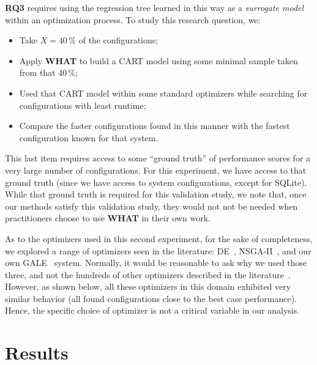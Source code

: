 \documentclass{sig-alternative}
\newcommand{\bi}{\begin{itemize}}%
\newcommand{\ei}{\end{itemize}}
\newcommand{\what}{{\bf WHAT }}
\begin{document}
{\bf RQ3} requires using the regression tree learned in this way as a {\em surrogate model} within an optimization process. To study this research question, we:
\bi
\item Take   $X=40\,\%$ of the configurations;
\item Apply \what to build a CART model using some minimal sample taken from that 40\,\%;
\item Used that CART model within some standard optimizers while searching for 
configurations with least runtime;
\item  Compare the faster configurations found in this manner with the fastest configuration
known for that system.
\ei
This last item requires access to some ``ground truth'' of performance scores for a very
large number of configurations. For this experiment, we have access to that ground truth
(since we have access to system configurations, except for SQLite). While that ground truth is required for this
validation study, we note that, once our methods satisfy this validation study,
they would not not be needed when practitioners choose to use \what in their own work.

As to the optimizers used in this second experiment, for the sake of completeness, we explored
a range of optimizers seen in the   literature:  DE~\cite{storn1997differential}, NSGA-II~\cite{deb00afast},
and our own GALE~\cite{krall2014gale,zuluaga2013active} system.   Normally,
it would be  reasonable to ask
why we used those three, and not the hundreds of other 
optimizers described in the literature~\cite{fletcher13,harman12}. However,
as shown below, all these optimizers in this
domain exhibited  very similar
behavior (all found configurations close to the
best case performance). Hence, the specific
choice of optimizer is not a critical
variable in  our analysis.


\section{Results}
\end{document}
